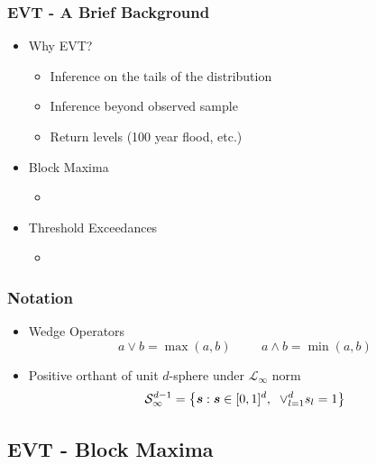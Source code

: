 \documentclass[aspectratio=169]{beamer}
\begin{document}
\begin{frame}
  \frametitle{EVT - A Brief Background}
  \begin{itemize}
    \item Why EVT?
        \begin{itemize}
            \item Inference on the tails of the distribution
            \item Inference beyond observed sample
            \item Return levels (100 year flood, etc.)
        \end{itemize}
    \item Block Maxima
        \begin{itemize}
            \item \citet{frechet1927,fisher1928,gumbel1942,jenkinson1955}
        \end{itemize}
    \item Threshold Exceedances
        \begin{itemize}
            \item \citet{pickands1975,balkema1974}
        \end{itemize}
  \end{itemize}
\end{frame} %
\begin{frame}
    \frametitle{Notation}
    \begin{itemize}
      \item Wedge Operators
        \begin{equation*}
            a \vee b = \max(a,b) \hspace{1cm} a\wedge b = \min(a,b)
        \end{equation*} 
      \item Positive orthant of unit $d$-sphere under $\mathcal{L}_{\infty}$ norm
        \begin{equation*}
          \mathcal{S}_{\infty}^{d-1} = \left\lbrace \bm{s} : \bm{s} \in [0,1]^d,\hspace{0.2cm}
                            \vee_{l=1}^d s_l = 1\right\rbrace
        \end{equation*}
    \end{itemize}
    
\end{frame} %

\subsection{EVT - Block Maxima}
\end{document}
